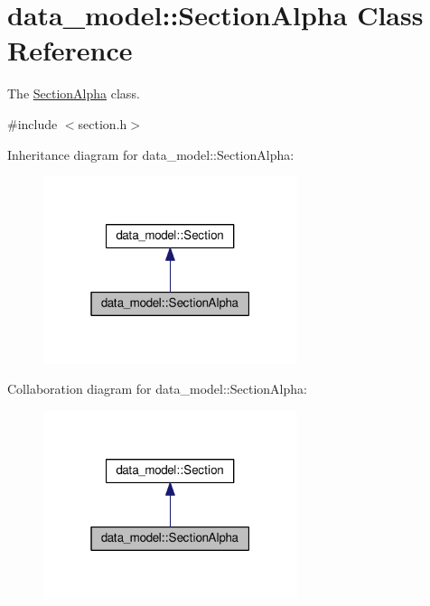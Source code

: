 \hypertarget{classdata__model_1_1_section_alpha}{}\section{data\+\_\+model\+:\+:Section\+Alpha Class Reference}
\label{classdata__model_1_1_section_alpha}


The \hyperlink{classdata__model_1_1_section_alpha}{Section\+Alpha} class.  




{\ttfamily \#include $<$section.\+h$>$}



Inheritance diagram for data\+\_\+model\+:\+:Section\+Alpha\+:
\nopagebreak
\begin{figure}[H]
\begin{center}
\leavevmode
\includegraphics[width=211pt]{classdata__model_1_1_section_alpha__inherit__graph}
\end{center}
\end{figure}


Collaboration diagram for data\+\_\+model\+:\+:Section\+Alpha\+:
\nopagebreak
\begin{figure}[H]
\begin{center}
\leavevmode
\includegraphics[width=211pt]{classdata__model_1_1_section_alpha__coll__graph}
\end{center}
\end{figure}
